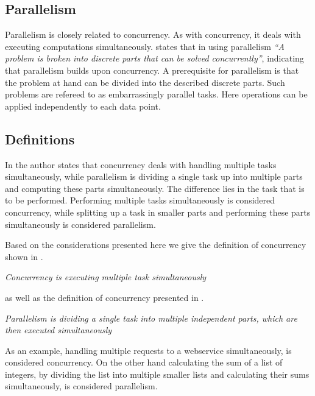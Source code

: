 \subsection{Parallelism}\label{sec:basics_parallelism}
Parallelism is closely related to concurrency. As with concurrency, it deals with executing computations simultaneously. \cite{introPar} states that in using parallelism \textit{``A problem is broken into discrete parts that can be solved concurrently''}, indicating that parallelism builds upon concurrency. A prerequisite for parallelism is that the problem at hand can be divided into the described discrete parts. Such problems are refereed to as embarrassingly parallel tasks\cite{sutter2005software}. Here operations can be applied independently to each data point.

\subsection{Definitions}\label{sec:basics_concurrency_parallelism_def}
In \cite[p. 24]{sevenModels} the author states that concurrency deals with handling multiple tasks simultaneously, while parallelism is dividing a single task up into multiple parts and computing these parts simultaneously. The difference lies in the task that is to be performed. Performing multiple tasks simultaneously is considered concurrency, while splitting up a task in smaller parts and performing these parts simultaneously is considered   parallelism.

Based on the considerations presented here we give the definition of concurrency shown in .

\begin{defn}\label{def:concurrency}
\emph{Concurrency is executing multiple task simultaneously}
\end{defn}
as well as the definition of concurrency presented in .

\begin{defn}\label{def:parallelism}
\emph{Parallelism is dividing a single task into multiple independent parts, which are then executed simultaneously}
\end{defn}
As an example, handling multiple requests to a webservice simultaneously, is considered concurrency. On the other hand calculating the sum of a list of integers, by dividing the list into multiple smaller lists and calculating their sums simultaneously, is considered parallelism.

